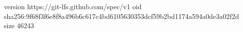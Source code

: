 version https://git-lfs.github.com/spec/v1
oid sha256:9f68f3f6e8f8a496b6c617c4bd6105630353dcf59b2bd1174a594a0de3a02f2d
size 46243
